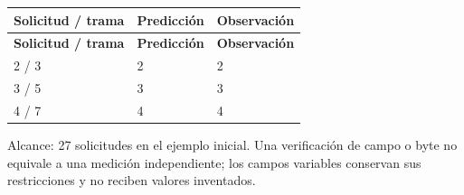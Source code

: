 \begingroup
\fontsize{9}{11}\selectfont
\addtocounter{table}{-1}
\begin{longtable}{p{3.2cm}p{5.1cm}p{5.1cm}}
\toprule
\textbf{Solicitud / trama} & \textbf{Predicción} & \textbf{Observación} \\ \midrule
\endfirsthead
\toprule
\textbf{Solicitud / trama} & \textbf{Predicción} & \textbf{Observación} \\ \midrule
\endhead
2 / 3 & 2 & 2 \\
3 / 5 & 3 & 3 \\
4 / 7 & 4 & 4 \\
\bottomrule
\end{longtable}
\endgroup
Alcance: 27 solicitudes en el ejemplo inicial. Una verificación de campo o byte no equivale a una medición independiente; los campos variables conservan sus restricciones y no reciben valores inventados.

